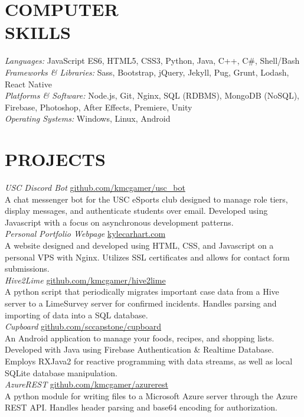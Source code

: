 \documentclass[line,margin]{res}
\begin{document}
\begin{resume}
\section{COMPUTER \\ SKILLS} {\sl Languages:} 
				JavaScript ES6, HTML5, CSS3, Python, Java, 
				C++, C\#, Shell/Bash \\
                {\sl Frameworks \& Libraries:}
                Sass, Bootstrap, jQuery, Jekyll, Pug, Grunt, Lodash, React Native\\
                {\sl Platforms \& Software:}
                Node.js, Git, Nginx, SQL (RDBMS), MongoDB (NoSQL), Firebase, Photoshop, After Effects, Premiere, Unity\\
                {\sl Operating Systems:}
                Windows, Linux, Android
                
\section{PROJECTS} {\sl USC Discord Bot} \hfill \href{https://www.github.com/kmcgamer/usc_bot}{github.com/kmcgamer/usc\_bot} \\
				A chat messenger bot for the USC eSports club designed to manage role tiers, display messages, and authenticate students over email. Developed using Javascript with a focus on asynchronous development patterns. \\[5pt]
				{\sl Personal Portfolio Webpage} \hfill \href{https://www.kylecarhart.com}{kylecarhart.com} \\
				A website designed and developed using HTML, CSS, and Javascript on a personal VPS with Nginx. Utilizes SSL certificates and allows for contact form submissions.\\[5pt]
				{\sl Hive2Lime} \hfill \href{https://www.github.com/kmcgamer/hive2lime}{github.com/kmcgamer/hive2lime} \\
				A python script that periodically migrates important case data from a Hive server to a LimeSurvey server for confirmed incidents. Handles parsing and importing of data into a SQL database.\\[5pt]
				{\sl Cupboard} \hfill \href{https://www.github.com/sccapstone/cupboard}{github.com/sccapstone/cupboard} \\
				An Android application to manage your foods, recipes, and shopping lists. Developed with Java using Firebase Authentication \& Realtime Database. Employs RXJava2 for reactive programming with data streams, as well as local SQLite database manipulation. \\[5pt]
				{\sl AzureREST} \hfill \href{https://www.github.com/kmcgamer/azurerest}{github.com/kmcgamer/azurerest} \\
				A python module for writing files to a Microsoft Azure server through the Azure REST API. Handles header parsing and base64 encoding for authorization.
 

\end{resume}
\end{document}
